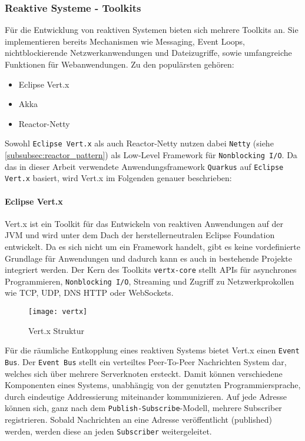 \subsubsection{Reaktive Systeme - Toolkits}
\label{subsubsec:reaktive_systeme}
Für die Entwicklung von reaktiven Systemen bieten sich mehrere Toolkits an.
Sie implementieren bereits Mechanismen wie Messaging, Event Loops,
nichtblockierende Netzwerkanwendungen und Dateizugriffe, sowie umfangreiche Funktionen für Webanwendungen.
Zu den populärsten gehören:
\begin{itemize}
    \item Eclipse Vert.x
    \item Akka
    \item Reactor-Netty
\end{itemize}\parencite{Vert.x, Akka, ProjectReactor}
Sowohl \verb|Eclipse Vert.x| als auch Reactor-Netty nutzen dabei \verb|Netty|
(siehe \ref{subsubsec:reactor_pattern}) als Low-Level Framework für \verb|Nonblocking I/O|.
Da das in dieser Arbeit verwendete Anwendungsframework \verb|Quarkus| auf \verb|Eclipse Vert.x| basiert, wird Vert.x im Folgenden genauer beschrieben:

\paragraph{Eclipse Vert.x}
Vert.x ist ein Toolkit für das Entwickeln von reaktiven Anwendungen auf der JVM und wird unter dem Dach der herstellerneutralen Eclipse Foundation entwickelt.
Da es sich nicht um ein Framework handelt, gibt es keine vordefinierte Grundlage für Anwendungen und dadurch kann es auch in bestehende Projekte
integriert werden.
Der Kern des Toolkits \verb|vertx-core| stellt APIs für asynchrones Programmieren, \verb|Nonblocking I/O|, Streaming und Zugriff zu
Netzwerkprokollen wie TCP, UDP, DNS HTTP oder WebSockets.
\begin{figure}[ht!]
    \centering
    \texttt{[image: vertx]}
    \caption{Vert.x Struktur \parencite{Ponge2020}}
    \label{fig:vertx}
\end{figure}

Für die räumliche Entkopplung eines reaktiven Systems bietet Vert.x einen \verb|Event Bus|.
Der \verb|Event Bus| stellt ein verteiltes Peer-To-Peer Nachrichten System dar, welches sich über mehrere Serverknoten ersteckt.
Damit können verschiedene Komponenten eines Systems, unabhängig von der genutzten Programmiersprache, durch eindeutige Addressierung miteinander kommunizieren.
Auf jede Adresse können sich, ganz nach dem \verb|Publish-Subscribe|-Modell, mehrere Subscriber registrieren. Sobald Nachrichten an eine
Adresse veröffentlicht (published) werden, werden diese an jeden \verb|Subscriber| weitergeleitet.

